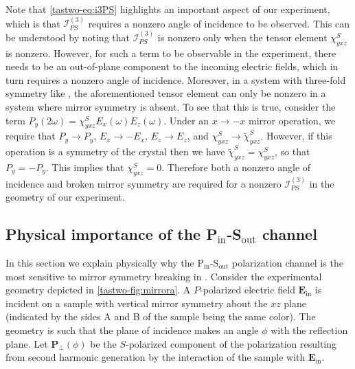 Note that \cref{tastwo-eq:i3PS} highlights an important aspect of our experiment, which is that $\mathscr{I}_{PS}^{(3)}$ requires a nonzero angle of incidence to be observed.
This can be understood by noting that $\mathscr{I}_{PS}^{(3)}$ is nonzero only when the tensor element $\chi^S_{yxz}$ is nonzero.
However, for such a term to be observable in the experiment, there needs to be an out-of-plane component to the incoming electric fields, which in turn requires a nonzero angle of incidence.
Moreover, in a system with three-fold symmetry like \tastwo, the aforementioned tensor element can only be nonzero in a system where mirror symmetry is absent.
To see that this is true, consider the term $P_y(2\omega)=\chi^S_{yxz}E_x(\omega)E_z(\omega)$.
Under an $x \rightarrow -x$ mirror operation, we require that $P_y \rightarrow P_y$, $E_x \rightarrow -E_x$, $E_z \rightarrow E_z$, and $\chi^S_{yxz} \rightarrow \widetilde{\chi}^S_{yxz}$.
However, if this operation is a symmetry of the crystal then we have $\widetilde{\chi}^S_{yxz} = \chi^S_{yxz}$, so that $P_y = -P_y$.
This implies that $\chi^S_{yxz} = 0$.
Therefore both a nonzero angle of incidence and broken mirror symmetry are required for a nonzero $\mathscr{I}_{PS}^{(3)}$ in the geometry of our experiment.

\subsection{Physical importance of the P$_\mathrm{in}$-S$_\mathrm{out}$ channel}

In this section we explain physically why the P$_\mathrm{in}$-S$_\mathrm{out}$ polarization channel is the most sensitive to mirror symmetry breaking in \tastwo.
Consider the experimental geometry depicted in \cref{tastwo-fig:mirrora}.
A $P$-polarized electric field $\bm{E}_\mathrm{in}$ is incident on a sample with vertical mirror symmetry about the $xz$ plane (indicated by the sides A and B of the sample being the same color). The geometry is such that the plane of incidence makes an angle $\phi$ with the reflection plane.
Let $\bm{P}_\perp(\phi)$ be the $S$-polarized component of the polarization resulting from second harmonic generation by the interaction of the sample with $\bm{E}_\mathrm{in}$.

